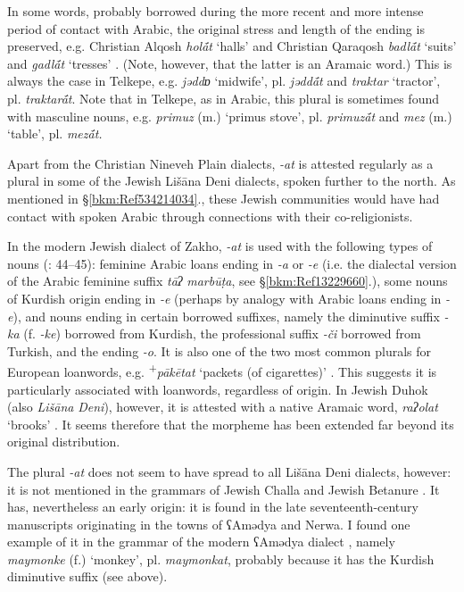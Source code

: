 \documentclass[output=paper]{langsci/langscibook}
\begin{document}
In some words, probably borrowed during the more recent and more intense period of contact with Arabic, the original stress and length of the ending is preserved, e.g. Christian Alqosh \textit{hol\'{ā}t} ‘halls’ and Christian Qaraqosh \textit{badl\'{ā}t} ‘suits’ and \textit{gadl\'{ā}t} ‘tresses’ \citep[194]{Khan2002}. (Note, however, that the latter is an Aramaic word.) This is always the case in Telkepe, e.g. \textit{jəddɒ} ‘midwife’, pl. \textit{jədd\'{ā}t} and \textit{traktar} ‘tractor’, pl. \textit{traktar\'{ā}t}. Note that in Telkepe, as in Arabic, this plural is sometimes found with masculine nouns, e.g. \textit{primuz} (m.) ‘primus stove’, pl. \textit{primuz\'{ā}t} and \textit{mez} (m.) ‘table’, pl. \textit{mez\'{ā}t.}

Apart from the Christian Nineveh Plain dialects, \textit{\nobreakdash-at} is attested regularly as a plural in some of the Jewish Lišāna Deni dialects, spoken further to the north. As mentioned in §\ref{bkm:Ref534214034}., these Jewish communities would have had contact with spoken Arabic through connections with their co-religionists.

In the modern Jewish dialect of Zakho, \textit{\nobreakdash-at} is used with the following types of nouns (\citealt{Sabar2002}: 44–45): feminine Arabic loans ending in \textit{\nobreakdash-a} or \textit{\nobreakdash-e} (i.e. the dialectal version of the Arabic feminine suffix \textit{tāʔ} \textit{marbūṭa}, see §\ref{bkm:Ref13229660}.), some nouns of Kurdish origin ending in \textit{\nobreakdash-e} (perhaps by analogy with Arabic loans ending in \textit{\nobreakdash-e}), and nouns ending in certain borrowed suffixes, namely the diminutive suffix \textit{\nobreakdash-ka} (f. \textit{\nobreakdash-ke}) borrowed from Kurdish, the professional suffix \textit{{}-či} borrowed from Turkish, and the ending \textit{\nobreakdash-o}. It is also one of the two most common plurals for European loanwords, e.g. \textsuperscript{+}\textit{pākētat} ‘packets (of cigarettes)’ \citep[57]{Sabar1990}. This suggests it is particularly associated with loanwords, regardless of origin. In Jewish Duhok (also \textit{Lišāna} \textit{Deni}), however, it is attested with a native Aramaic word, \textit{raʔolat} ‘brooks’ \citep[45]{Sabar2002}. It seems therefore that the morpheme has been extended far beyond its original distribution.

The plural \textit{{}-at} does not seem to have spread to all Lišāna Deni dialects, however: it is not mentioned in the grammars of Jewish Challa \citep{Fassberg2010} and Jewish Betanure \citep{Mutzafi2008}. It has, nevertheless an early origin: it is found in the late seventeenth-century manuscripts originating in the towns of ʕAmədya and Nerwa. I found one example of it in the grammar of the modern ʕAmədya dialect \citep[70]{Greenblatt2011}, namely \textit{maymonke} (f.) ‘monkey’, pl. \textit{maymonkat}, probably because it has the Kurdish diminutive suffix (see above).
\end{document}
